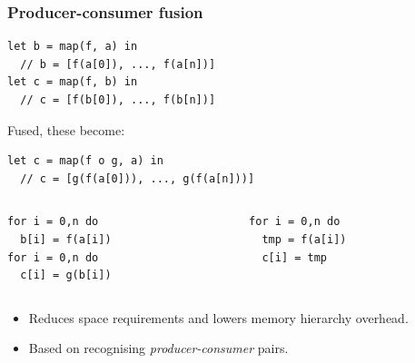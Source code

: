 \documentclass{beamer}
\begin{document}
\begin{frame}[fragile]
  \frametitle{Producer-consumer fusion}

\begin{lstlisting}
let b = map(f, a) in
  // b = [f(a[0]), ..., f(a[n])]
let c = map(f, b) in
  // c = [f(b[0]), ..., f(b[n])]
\end{lstlisting}

  Fused, these become:

\begin{lstlisting}
let c = map(f o g, a) in
  // c = [g(f(a[0])), ..., g(f(a[n]))]
\end{lstlisting}
  \pause
  \begin{columns}
    \begin{column}{0.5\textwidth}
\begin{lstlisting}
for i = 0,n do
  b[i] = f(a[i])
for i = 0,n do
  c[i] = g(b[i])
\end{lstlisting}
    \end{column}
    \begin{column}{0.5\textwidth}
\begin{lstlisting}
for i = 0,n do
  tmp = f(a[i])
  c[i] = tmp
\end{lstlisting}
    \end{column}
  \end{columns}

  \begin{itemize}
  \item Reduces space requirements and lowers memory hierarchy overhead.
  \item Based on recognising \textit{producer-consumer} pairs.
  \end{itemize}
\end{frame}
\end{document}
